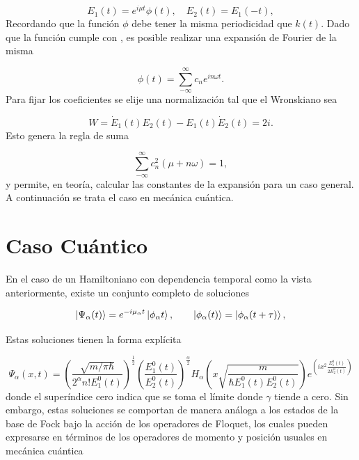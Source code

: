 \documentclass[10pt,a4paper]{report}
\begin{document}
\begin{equation}
E_1(t) = e^{i\mu t}\phi(t), \quad E_2(t)=E_1(-t),
\end{equation}
Recordando que la función $\phi$ debe tener la misma periodicidad que
$k(t)$. Dado que la función cumple con , es posible realizar una expansión de Fourier
\cite{ArfkenMM} de la misma

\begin{equation}
\phi(t) = \sum_{-\infty}^\infty c_n e^{in\omega t}.
\end{equation} Para fijar los coeficientes se elije una normalización tal que el Wronskiano sea


\begin{equation}
W = \dot{E}_1(t)E_2(t)-E_1(t)\dot{E}_2(t) = 2i.
\end{equation}Esto genera la regla de suma

\begin{equation}
\sum_{-\infty}^\infty c_n^2(\mu + n\omega) = 1,
\end{equation} y permite, en teoría, calcular las constantes de la expansión para un caso general. A continuación se trata el caso en mecánica cuántica.



\section{Caso Cuántico}

En el caso de un Hamiltoniano con dependencia temporal como la vista
anteriormente, existe un conjunto completo de soluciones
\cite{BarnettSD}

\begin{equation}
\Ket{\Psi_\alpha (t)} = e^{-i\mu_\alpha t}\Ket{\phi_\alpha t}, \qquad \Ket{\phi_\alpha (t)}=\Ket{\phi_\alpha (t+\tau)},
\end{equation}

Estas soluciones tienen la forma explícita\cite{BrownPT}

\begin{equation}
\Psi_\alpha (x,t) = (\frac{\sqrt{m/\pi\hbar}}{2^\alpha n!E_1^0(t)})^{\frac{1}{2}}(\frac{E_1^0(t)}{E_2^0(t)})^\frac{\alpha}{2}H_\alpha(x\sqrt{\frac{m}{\hbar E_1^0(t) E_2^0(t)}})e^{(ix^2\frac{E_1^0(t)}{2E_2^0(t)})}
\end{equation} donde el superíndice cero indica que se toma el límite donde $\gamma$ tiende a cero. Sin embargo, estas soluciones se comportan de manera análoga a los estados de la base de Fock bajo la acción de los operadores de Floquet, los cuales pueden expresarse en términos de los operadores de momento y posición usuales en mecánica cuántica
\end{document}
